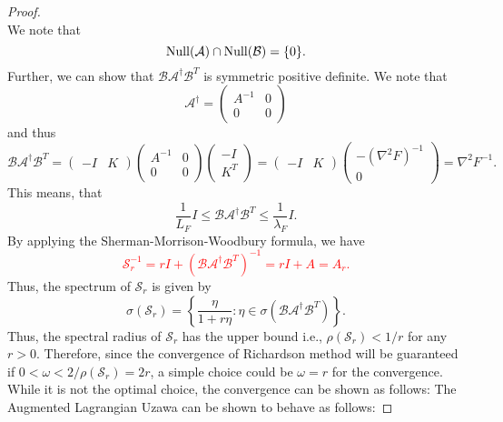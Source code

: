 \begin{itemize}
\begin{proof}
\begin{equation}
\end{equation} 
We note that 
\begin{equation}
{\rm Null}(\mathcal{A}) \cap {\rm Null}(\mathcal{B}) = \{ 0\}. 
\end{equation}
Further, we can show that $\mathcal{B} \mathcal{A}^\dag \mathcal{B}^T$ is symmetric positive definite. We note that 
\begin{equation}
\mathcal{A}^\dag = \begin{pmatrix} A^{-1} & 0 \\ 0 & 0 \end{pmatrix} 
\end{equation} 
and thus 
\begin{equation}
\mathcal{B}\mathcal{A}^\dag \mathcal{B}^T = \begin{pmatrix} -I & K \end{pmatrix}  \begin{pmatrix} A^{-1} & 0 \\ 0 & 0 \end{pmatrix} \begin{pmatrix} -I \\ K^T \end{pmatrix} = \begin{pmatrix} -I & K \end{pmatrix} \begin{pmatrix} -(\nabla^2 F)^{-1} \\ 0 \end{pmatrix} = \nabla^2 F^{-1}.
\end{equation} 
This means, that 
\begin{equation}
\frac{1}{L_F} I \leq \mathcal{B} \mathcal{A}^\dag \mathcal{B}^T \leq \frac{1}{\lambda_F} I.   
\end{equation} 
By applying the Sherman-Morrison-Woodbury formula, we have  
\textcolor{red}{\begin{equation}
\mathcal{S}_r^{-1} = rI + (\mathcal{B} \mathcal{A}^\dag \mathcal{B}^T)^{-1} = rI + A = A_r.    
\end{equation}}
Thus, the spectrum of $\mathcal{S}_r$ is given by 
\begin{equation}
\sigma(\mathcal{S}_r) = \left \{\frac{\eta}{1 + r \eta} : \eta \in \sigma(\mathcal{B}\mathcal{A}^\dag \mathcal{B}^T) \right \}.
\end{equation}
Thus, the spectral radius of $\mathcal{S}_r$ has the upper bound i.e., $\rho(\mathcal{S}_r) < 1/r$ for any $r > 0$. Therefore, since the convergence of Richardson method will be guaranteed if $0 < \omega < 2/\rho(\mathcal{S}_r) = 2r$, a simple choice could be $\omega = r$ for the convergence. While it is not the optimal choice, the convergence can be shown as follows: The Augmented Lagrangian Uzawa can be shown to behave as follows: 

\end{proof}
\end{itemize}
